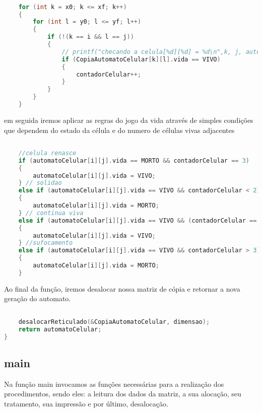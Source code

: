 \documentclass{article}
\begin{document}
\begin{lstlisting}[caption={Função evoluirReticulado parte 3},label={lst:cod9},language=C]

    for (int k = x0; k <= xf; k++)
    {
        for (int l = y0; l <= yf; l++)
        {
            if (!(k == i && l == j))
            {
                // printf("checando a celula[%d][%d] = %d\n",k, j, automatoCelular[k][l].vida);
                if (CopiaAutomatoCelular[k][l].vida == VIVO)
                {
                    contadorCelular++;
                }
            }
        }
    }

\end{lstlisting}

em seguida iremos aplicar as regras do jogo da vida através de simples condições que dependem do estado da célula e do numero de células vivas adjacentes

\begin{lstlisting}[caption={Função evoluirReticulado parte 4},label={lst:cod10},language=C]
    
    //celula renasce
    if (automatoCelular[i][j].vida == MORTO && contadorCelular == 3)
    {
        automatoCelular[i][j].vida = VIVO;
    } // solidao
    else if (automatoCelular[i][j].vida == VIVO && contadorCelular < 2)
    {
        automatoCelular[i][j].vida = MORTO;
    } // continua viva
    else if (automatoCelular[i][j].vida == VIVO && (contadorCelular == 2  || contadorCelular == 3))
    {
        automatoCelular[i][j].vida = VIVO;
    } //sufocamento
    else if (automatoCelular[i][j].vida == VIVO && contadorCelular > 3)
    {
        automatoCelular[i][j].vida = MORTO;
    }

\end{lstlisting}


Ao final da função, iremos desalocar nossa matriz de cópia e retornar a nova geração do automato.	

\begin{lstlisting}[caption={Função evoluirReticulado parte 5},label={lst:cod11},language=C]
    
    desalocarReticulado(&CopiaAutomatoCelular, dimensao);
    return automatoCelular;
}

\end{lstlisting}

\clearpage
\subsection{main}

Na função main invocamos as funções necessárias para a realização dos procedimentos, sendo eles: a leitura dos dados da matriz, a sua alocação, seu tratamento, sua impressão e por último, desalocação.
\end{document}

